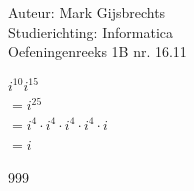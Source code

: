 \documentclass[a4paper]{article}
\begin{document}
\noindent \large Auteur: Mark Gijsbrechts \\
\noindent \large Studierichting: Informatica\\
\noindent \large Oefeningenreeks 1B nr. 16.11\\

\medskip

\normalsize



$i^{10}i^{15}$ \\

$=i^{25}$ \\

$=i^4 \cdot i^4 \cdot i^4 \cdot i^4 \cdot i$ \\

$=i$ 



\begin{thebibliography}{999}
\end{thebibliography}
\end{document}
